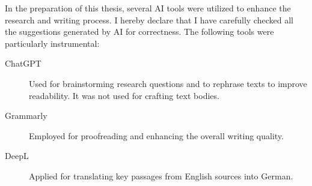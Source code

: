 In the preparation of this thesis, several AI tools were utilized to enhance the research and writing process.
I hereby declare that I have carefully checked all the suggestions generated by AI for correctness.
The following tools were particularly instrumental:

\begin{description}
    \item[ChatGPT] Used for brainstorming research questions and to rephrase texts to improve readability. It was not used for crafting text bodies.
    \item[Grammarly] Employed for proofreading and enhancing the overall writing quality.
    \item[DeepL] Applied for translating key passages from English sources into German.
\end{description}

